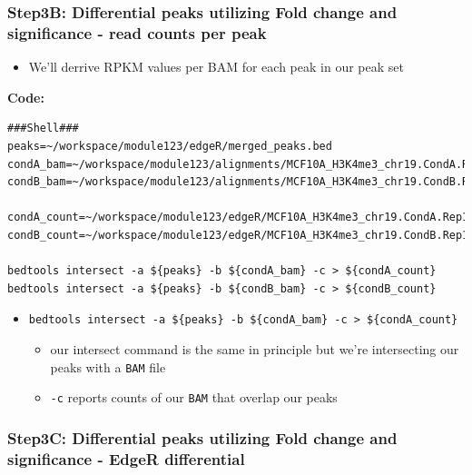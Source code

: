 \documentclass[
]{book}
\providecommand{\tightlist}{%
  \setlength{\itemsep}{0pt}\setlength{\parskip}{0pt}}
\begin{document}
\subsubsection{Step3B: Differential peaks utilizing Fold change and significance - read counts per peak}\label{step3b-differential-peaks-utilizing-fold-change-and-significance---read-counts-per-peak}

\begin{itemize}
\tightlist
\item
  We'll derrive RPKM values per BAM for each peak in our peak set
\end{itemize}

\textbf{Code:}

\begin{verbatim}
###Shell###
peaks=~/workspace/module123/edgeR/merged_peaks.bed
condA_bam=~/workspace/module123/alignments/MCF10A_H3K4me3_chr19.CondA.Rep1.bam
condB_bam=~/workspace/module123/alignments/MCF10A_H3K4me3_chr19.CondB.Rep1.bam

condA_count=~/workspace/module123/edgeR/MCF10A_H3K4me3_chr19.CondA.Rep1.bed
condB_count=~/workspace/module123/edgeR/MCF10A_H3K4me3_chr19.CondB.Rep1.bed

bedtools intersect -a ${peaks} -b ${condA_bam} -c > ${condA_count}
bedtools intersect -a ${peaks} -b ${condB_bam} -c > ${condB_count}
\end{verbatim}

\begin{itemize}
\tightlist
\item
  \texttt{bedtools\ intersect\ -a\ \$\{peaks\}\ -b\ \$\{condA\_bam\}\ -c\ \textgreater{}\ \$\{condA\_count\}}

  \begin{itemize}
  \tightlist
  \item
    our intersect command is the same in principle but we're intersecting our peaks with a \texttt{BAM} file
  \item
    \texttt{-c} reports counts of our \texttt{BAM} that overlap our peaks
  \end{itemize}
\end{itemize}

\subsubsection{Step3C: Differential peaks utilizing Fold change and significance - EdgeR differential}\label{step3c-differential-peaks-utilizing-fold-change-and-significance---edger-differential}
\end{document}
